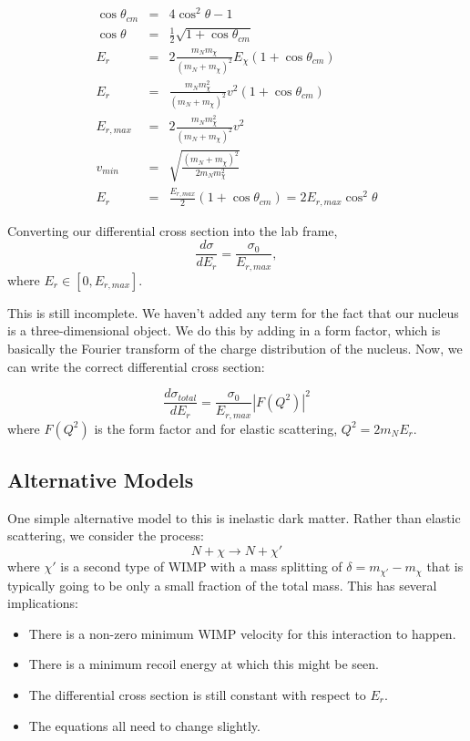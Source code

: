 \documentclass{article}
\begin{document}
\begin{eqnarray}
\cos\theta_{cm} &=& 4 \cos^2\theta - 1 \\
\cos\theta &=& \frac{1}{2}\sqrt{1+\cos\theta_{cm}} \\
E_r &=& 2 \frac{m_N m_\chi}{(m_N+m_\chi)^2}E_\chi(1+\cos\theta_{cm}) \\
E_r &=& \frac{m_N m_\chi^2}{(m_N+m_\chi)^2}v^2(1+\cos\theta_{cm}) \\
E_{r,max} &=& 2\frac{m_N m_\chi^2}{(m_N+m_\chi)^2}v^2 \\
v_{min} &=& \sqrt{\frac{(m_N + m_\chi)^2}{2m_Nm_\chi^2}} \\
E_{r} &=& \frac{E_{r,max}}{2}(1+\cos\theta_{cm}) = 2E_{r,max}\cos^2\theta
\end{eqnarray}

Converting our differential cross section into the lab frame,
\begin{equation}
\frac{d\sigma}{dE_r } = \frac{\sigma_0}{E_{r,max}},
\end{equation}
where $E_r \in [0,E_{r,max}]$.

This is still incomplete. We haven't added any term for the fact that our nucleus is a three-dimensional
object. We do this by adding in a form factor, which is basically the Fourier transform of the 
charge distribution of the nucleus. Now, we can write the correct differential cross section:

\begin{equation}
\frac{d\sigma_{total}}{dE_r} = \frac{\sigma_0}{E_{r,max}} | F(Q^2) |^2
\end{equation}
where $F(Q^2)$ is the form factor and for elastic scattering, $Q^2 = 2m_N E_r$.

\subsection{Alternative Models}

One simple alternative model to this is inelastic dark matter.
Rather than elastic scattering, we consider the process:
\begin{equation}
N + \chi \longrightarrow N + \chi'
\end{equation}
where $\chi'$ is a second type of WIMP with a mass splitting of $\delta = m_{\chi'} - m_\chi$ that
is typically going to be only a small fraction of the total mass.
This has several implications:
\begin{itemize}
\item There is a non-zero minimum WIMP velocity for this interaction to happen.
\item There is a minimum recoil energy at which this might be seen.
\item The differential cross section is still constant with respect to $E_r$.
\item The equations all need to change slightly.
\end{itemize}
\end{document}
